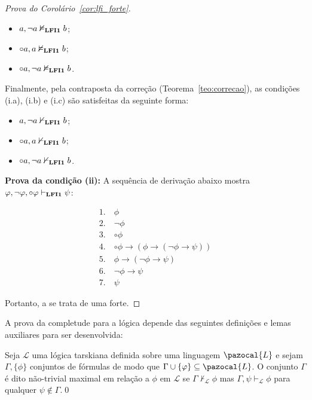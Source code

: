 \begin{proof}[Prova do Corolário~\ref{cor:lfi_forte}]
        \begin{itemize}
            \item $a, \neg a \nvDash_{{\normalfont\textbf{LFI1}}{}} b$;
            \item $\circ a, a \nvDash_{{\normalfont\textbf{LFI1}}{}} b$;
            \item $\circ a, \neg a \nvDash_{{\normalfont\textbf{LFI1}}{}} b$.
        \end{itemize}

        Finalmente, pela contraposta da correção (Teorema~\ref{teo:correcao}), as condições (i.a), (i.b) e (i.c) são satisfeitas da seguinte forma:

        \begin{itemize}
            \item $a, \neg a \nvdash_{{\normalfont\textbf{LFI1}}{}} b$;
            \item $\circ a, a \nvdash_{{\normalfont\textbf{LFI1}}{}} b$;
            \item $\circ a, \neg a \nvdash_{{\normalfont\textbf{LFI1}}{}} b$.
        \end{itemize}

        \noindent\textbf{Prova da condição (ii):} A sequência de derivação abaixo mostra $\varphi, \neg \varphi, \circ \varphi \vdash_{{\normalfont\textbf{LFI1}}{}} \psi$:

        \begin{align*}
            1.~ & \phi \tag{Premissa}       \\
            2.~ & \neg \phi \tag{Premissa}  \\
            3.~ & \circ \phi \tag{Premissa} \\
            4.~ & \circ \phi \to (\phi \to (\neg \phi \to \psi)) \tag{bc1} \\
            5.~ & \phi \to (\neg \phi \to \psi) \tag{MP 3, 4} \\
            6.~ & \neg \phi \to \psi \tag{MP 1, 5} \\
            7.~ & \psi \tag{MP 2, 6}
        \end{align*}


        Portanto, a \lfium{} se trata de uma \lfi{} forte.
    \end{proof}

    A prova da completude para a lógica \lfium{} depende das seguintes definições e lemas auxiliares para ser desenvolvida:

    \begin{definicao}\label{def:nao-trivial_maximal}
        Seja $\mathcal{L}$ uma lógica tarskiana definida sobre uma linguagem $\pazocal{L}$ e sejam $\Gamma, \{\phi\}$ conjuntos de fórmulas de modo que $\Gamma \cup \{\phi\} \subseteq \pazocal{L}$. O conjunto $\Gamma$ é dito não-trivial maximal em relação a $\phi$ em $\mathcal{L}$ se $\Gamma \nvdash_{\mathcal{L}} \phi$ mas $\Gamma, \psi \vdash_{\mathcal{L}} \phi$ para qualquer $\psi \notin \Gamma$.\qed{}
    \end{definicao}

